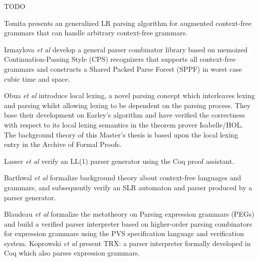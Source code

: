 %
\begin{isabellebody}%
%
%
\isadelimtheory
%
\endisadelimtheory
%
\isatagtheory
%
\endisatagtheory
{\isafoldtheory}%
%
\isadelimtheory
%
\endisadelimtheory
%
\isadelimdocument
%
\endisadelimdocument
%
\isatagdocument
%
\isamarkuptrue%
%
\endisatagdocument
{\isafolddocument}%
%
\isadelimdocument
%
\endisadelimdocument
%
\begin{isamarkuptext}%
TODO%
\end{isamarkuptext}\isamarkuptrue%
%
\isadelimdocument
%
\endisadelimdocument
%
\isatagdocument
%
\isamarkuptrue%
%
\endisatagdocument
{\isafolddocument}%
%
\isadelimdocument
%
\endisadelimdocument
%
\begin{isamarkuptext}%
Tomita \cite{Tomita:1987} presents an generalized LR parsing algorithm for augmented
context-free grammars that can handle arbitrary context-free grammars.

Izmaylova \textit{et al} \cite{Izmaylova:2016} develop a general parser 
combinator library based on memoized Continuation-Passing Style (CPS) recognizers that supports all
context-free grammars and constructs a Shared Packed Parse Forest (SPPF) in worst case cubic time and space.%
\end{isamarkuptext}\isamarkuptrue%
%
\begin{isamarkuptext}%
Obua \textit{et al} \cite{Obua:2017} introduce local lexing, a novel parsing concept which interleaves
lexing and parsing whilst allowing lexing to be dependent on the parsing process. They base their
development on Earley's algorithm and have verified the correctness with respect to its local lexing
semantics in the theorem prover Isabelle/HOL. The background theory of this Master's thesis is based
upon the local lexing entry \cite{LocalLexing-AFP} in the Archive of Formal Proofs.

Lasser \textit{et al} \cite{Lasser:2019} verify an LL(1) parser generator using the Coq proof assistant.

Barthwal \textit{et al} \cite{Barthwal:2009} formalize background theory
about context-free languages and grammars, and subsequently verify an SLR automaton and parser produced
by a parser generator.

Blaudeau \textit{et al} \cite{Blaudeau:2020} formalize the metatheory on Parsing expression grammars (PEGs) and
build a verified parser interpreter based on higher-order parsing combinators for expression grammars
using the PVS specification language and verification system. Koprowski \textit{et al} \cite{Koprowski:2011}
present TRX: a parser interpreter formally developed in Coq which also parses expression grammars.


\end{isamarkuptext}
\end{isabellebody}
